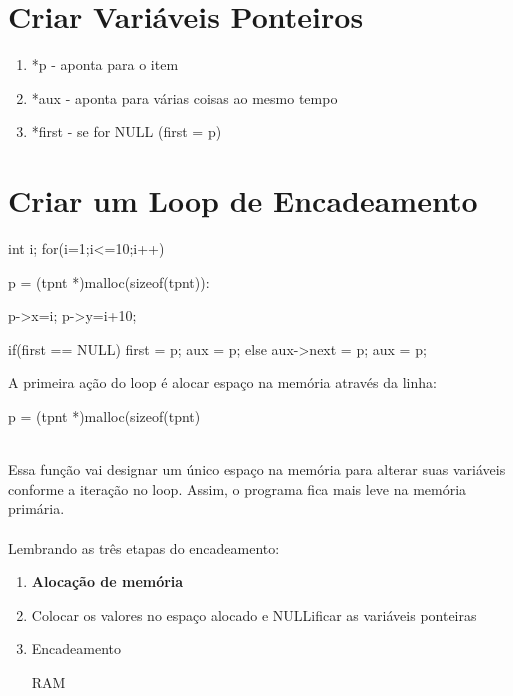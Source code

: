 \documentclass[ ]{article}
\begin{document}
\section{Criar Variáveis Ponteiros}
\begin{minipage}{8 cm}
	\begin{mylist}
int(main){
	tpnt *p;
	tpnt *aux;
	tpnt *first = NULL;
	\end{mylist}
\end{minipage}
\begin{minipage}{8 cm}
	\begin{enumerate}
		\item *p - aponta para o item
		\item *aux - aponta para várias coisas ao mesmo tempo
		\item *first - se for NULL (first = p)
	\end{enumerate}
\end{minipage}

\section{Criar um Loop de Encadeamento}
	\begin{mylist}
	int i;
	for(i=1;i<=10;i++){
		p = (tpnt *)malloc(sizeof(tpnt)):

		p->x=i;
		p->y=i+10;
		
		if(first == NULL){
			first = p;
			aux = p;
		}
		else{
			aux->next = p;
			aux = p;
		}
	}
		
	\end{mylist}
	A primeira ação do loop é alocar espaço na memória através da linha:\begin{mylist}		p = (tpnt *)malloc(sizeof(tpnt)\end{mylist}\\
	Essa função vai designar um único espaço na memória para alterar suas variáveis conforme a iteração no loop. Assim, o programa fica mais leve na memória primária.\\
	\\
	Lembrando as três etapas do encadeamento:
	\begin{enumerate}
	\item \textbf{Alocação de memória}
	\item Colocar os valores no espaço alocado e NULLificar as variáveis ponteiras
	\item Encadeamento \vspace{1 cm} \\
	\begin{huge}
	RAM
	\end{huge}
	\end{enumerate}
	
\end{document}

